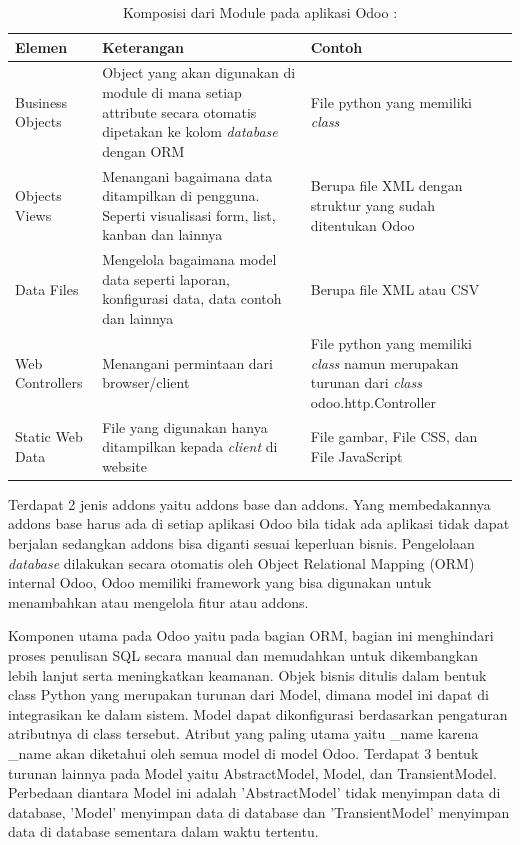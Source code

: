 \begingroup
\setlength{\LTleft}{-20cm plus -1fill}
\setlength{\LTright}{\LTleft}
\begin{small}
	\begin{longtable}{|p{2.5cm}|p{6cm}|p{4.5cm}|}
		\caption{Komposisi dari Module pada aplikasi Odoo \cite{odoo}:}\\
		\hline
		\textbf{Elemen} & \textbf{Keterangan} & \textbf{Contoh}\\
		\endfirsthead
		
		\hline
		    Business Objects
		  & Object yang akan digunakan di module di mana setiap attribute secara otomatis dipetakan ke kolom \textit{database} dengan ORM
		  & File python yang memiliki \textit{class}\\
		\hline  
		Objects Views
		  & Menangani bagaimana data ditampilkan di pengguna. Seperti visualisasi form, list, kanban dan lainnya
		  & Berupa file XML dengan struktur yang sudah ditentukan Odoo\\
		\hline
		Data Files
		  & Mengelola bagaimana model data seperti laporan, konfigurasi data, data contoh dan lainnya
		  & Berupa file XML atau CSV\\
		\hline
		Web Controllers
		  & Menangani permintaan dari browser/client
		  & File python yang memiliki \textit{class} namun merupakan turunan dari \textit{class} odoo.http.Controller\\
		\hline
		  Static Web Data
		  & File yang digunakan hanya ditampilkan kepada \textit{client} di website
		  & File gambar, File CSS, dan File JavaScript\\
		 \hline  
	\end{longtable}
\end{small}
\endgroup

Terdapat 2 jenis addons yaitu addons base dan addons. Yang membedakannya addons base harus ada di setiap aplikasi Odoo bila tidak ada aplikasi tidak dapat berjalan sedangkan addons bisa diganti sesuai keperluan bisnis. Pengelolaan \textit{database} dilakukan secara otomatis oleh Object Relational Mapping (ORM) internal Odoo, Odoo memiliki framework yang bisa digunakan untuk menambahkan atau mengelola fitur atau addons. 

Komponen utama pada Odoo yaitu pada bagian ORM, bagian ini menghindari proses penulisan SQL secara manual dan memudahkan untuk dikembangkan lebih lanjut serta meningkatkan keamanan. Objek bisnis ditulis dalam bentuk class Python yang merupakan turunan dari Model, dimana model ini dapat di integrasikan ke dalam sistem. Model dapat dikonfigurasi berdasarkan pengaturan atributnya di class tersebut. Atribut yang paling utama yaitu {\_}name karena {\_}name akan diketahui oleh semua model di model Odoo. Terdapat 3 bentuk turunan lainnya pada Model yaitu AbstractModel, Model, dan TransientModel. Perbedaan diantara Model ini adalah 'AbstractModel' tidak menyimpan data di database, 'Model' menyimpan data di database dan 'TransientModel' menyimpan data di database sementara dalam waktu tertentu.

